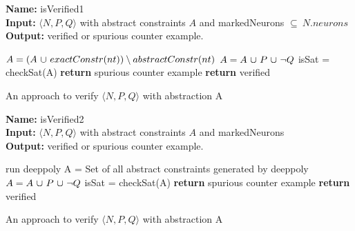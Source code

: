 \begin{algorithm}[t]
  \textbf{Name: } isVerified1 \\
  \textbf{Input: } $\langle N,P,Q \rangle$ with abstract constraints $A$ and markedNeurons $\subseteq ~ N.neurons$ \\
  \textbf{Output: } verified or spurious counter example. 
  \begin{algorithmic}[1]
      \State $A = (A ~ {\cup} ~ exactConstr(nt)) \setminus abstractConstr(nt)$
    \EndFor
    \State $A = A ~ {\cup} ~ P ~ {\cup} ~ \neg Q$
    \State isSat = checkSat(A)
      \State \textbf{return} spurious counter example
    \Else
      \State \textbf{return} verified
    \EndIf
  \end{algorithmic}
  \caption{An approach to verify $\langle N,P,Q \rangle$ with abstraction A}
  \label{algo:verif1}
\end{algorithm}

\begin{algorithm}[t]
  \textbf{Name: } isVerified2 \\
  \textbf{Input: } $\langle N,P,Q \rangle$ with abstract constraints $A$ and markedNeurons \\
  \textbf{Output: } verified or spurious counter example. 
  \begin{algorithmic}[1]
      \State run deeppoly
        \State A = Set of all abstract constraints generated by deeppoly
        \State $A = A ~ {\cup} ~ P ~ {\cup} ~ \neg Q$ 
        \State isSat = checkSat(A)
          \State \textbf{return} spurious counter example
        \EndIf
      \EndIf
    \EndFor
    \State \textbf{return} verified
  \end{algorithmic}
  \caption{An approach to verify $\langle N,P,Q \rangle$ with abstraction A}
  \label{algo:verif2}
\end{algorithm}



